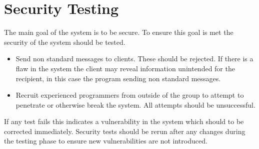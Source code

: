 \section{Security Testing}
The main goal of the system is to be secure. To ensure this goal is met the 
security of the system should be tested.
\begin{itemize}
\item Send non standard messages to clients. These should be rejected. If there 
is a flaw in the system the client may reveal information unintended for the 
recipient, in this case the program sending non standard messages.
\item Recruit experienced programmers from outside of the group to attempt to 
penetrate or otherwise break the system. All attempts should be unsuccessful.
\end{itemize}
If any test fails this indicates a vulnerability in the system which 
should to be corrected immediately. Security tests should be rerun after any 
changes during the testing phase to ensure new vulnerabilities are not 
introduced.
